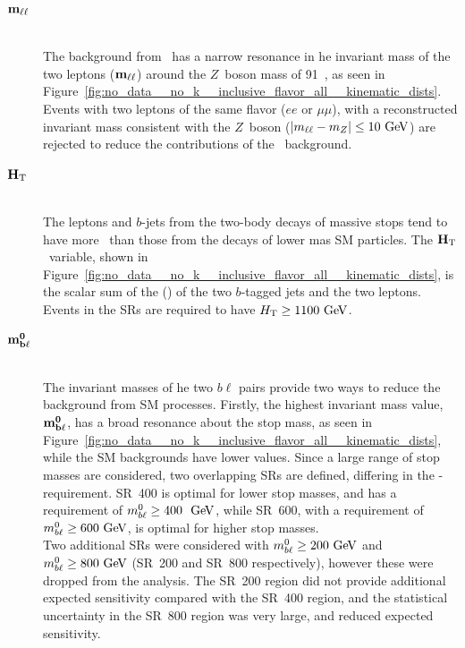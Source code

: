 \begin{description}
  \item[$\mathbf{m_{\ell\ell}}$] \hfill \\
    The background from \ZGAMMAJETS\ has a narrow resonance in he invariant
    mass of the two leptons ($\mathbf{m_{\ell\ell}}$) around the $Z$~boson mass of
    91~\GeV, as seen in
    Figure~\ref{fig:no_data__no_k__inclusive_flavor_all__kinematic_dists}.
    Events with two leptons of the same flavor ($ee$ or $\mu\mu$), with a
    reconstructed invariant mass consistent with the $Z$~boson
    ($|m_{\ell\ell} - m_{Z}| \leq 10 \GeV$) are rejected to reduce the
    contributions of the \ZGAMMAJETS\ background.
  \item[$\mathbf{H_{\mathrm{T}}}$] \hfill \\
    The leptons and $b$-jets from the two-body decays of massive stops tend to
    have more \pt\ than those from the decays of lower mas SM particles.
    The $\mathbf{H_{\mathrm{T}}}$\ variable, shown in
    Figure~\ref{fig:no_data__no_k__inclusive_flavor_all__kinematic_dists},
    is the scalar sum of the \et(\pt) of the two $b$-tagged jets and the two
    leptons.
    Events in the SRs are required to have $\HT \geq 1100 \GeV$.
  \item[$\mathbf{m_{b\ell}^{0}}$] \hfill \\
    The invariant masses of he two $b\ell$ pairs provide two ways to reduce
    the background from SM processes.
    Firstly, the highest invariant mass value, $\mathbf{m_{b\ell}^{0}}$, has a broad
    resonance about the stop mass, as seen in
    Figure~\ref{fig:no_data__no_k__inclusive_flavor_all__kinematic_dists},
    while the SM backgrounds have lower values.
    Since a large range of stop masses are considered, two overlapping SRs are
    defined, differing in the \MBL-requirement.
    SR~400 is optimal for lower stop masses, and has a requirement of
    $\MBL^0 \geq 400~\GeV$, while SR~600, with a requirement of
    $\MBL^0 \geq 600 \GeV$, is optimal for higher stop masses.
    \\[1ex]
    Two additional SRs were considered with $\MBL^0 \geq 200 \GeV$ and
    $\MBL^0 \geq 800 \GeV$ (SR~200 and SR~800 respectively), however these
    were dropped from the analysis.
    The SR~200 region did not provide additional expected sensitivity compared
    with the SR~400 region, and the statistical uncertainty in the SR~800
    region was very large, and reduced expected sensitivity.

\end{description}
